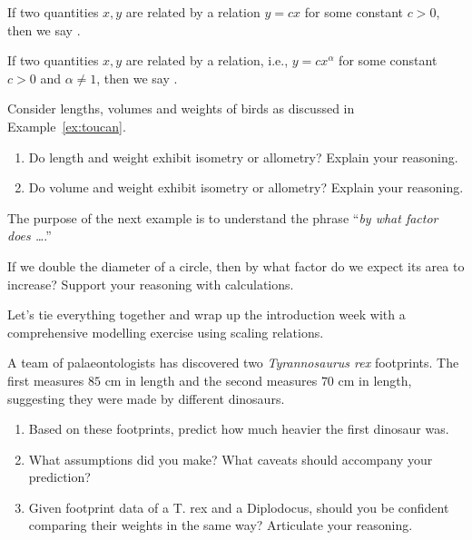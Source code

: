 \documentclass[../main.tex]{subfiles}
\begin{document}
\begin{mdframed}[style=simple-compact]
  If two quantities \(x,y\) are related by a  relation \(y = c x\) for some constant \(c > 0\), then we say .

  If two quantities \(x,y\) are related by a  relation, i.e., \(y = c x^{\alpha}\) for some constant \(c > 0\) and \(\alpha \ne 1\), then we say .
\end{mdframed}

\begin{example}
  Consider lengths, volumes and weights of birds as discussed in Example~\ref{ex:toucan}.

  \begin{enumerate}[wide]
    \item Do length and weight exhibit isometry or allometry? Explain your reasoning.

    \item Do volume and weight exhibit isometry or allometry? Explain your reasoning.
  \end{enumerate}
\end{example}

The purpose of the next example is to understand the phrase ``\emph{by what factor does \ldots{}}.''
\begin{example}
  If we double the diameter of a circle, then by what factor do we expect its area to increase? Support your reasoning with calculations.
\end{example}

\clearpage
Let's tie everything together and wrap up the introduction week with a comprehensive modelling exercise using scaling relations.
\begin{example}
  A team of palaeontologists has discovered two \emph{Tyrannosaurus rex} footprints. The first measures \(85\) cm in length and the second measures \(70\) cm in length, suggesting they were made by different dinosaurs. 

  \begin{enumerate}[wide]
    \item Based on these footprints, predict how much heavier the first dinosaur was.


    \item What assumptions did you make? What caveats should accompany your prediction?

    \item Given footprint data of a T. rex and a Diplodocus, should you be confident comparing their weights in the same way? Articulate your reasoning.
  \end{enumerate}
\end{example}
\end{document}

